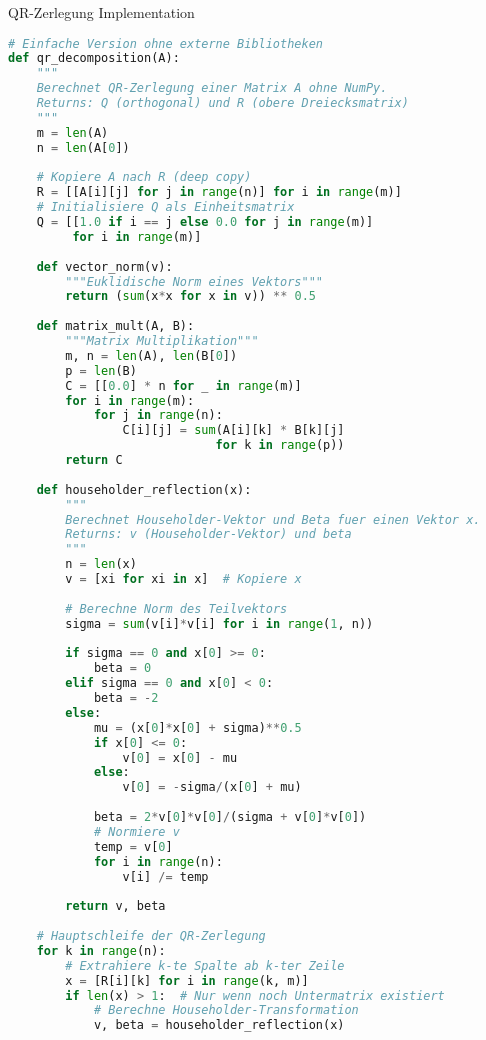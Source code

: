 \begin{examplecode}{QR-Zerlegung Implementation}
\begin{lstlisting}[language=Python, style=basesmol]
# Einfache Version ohne externe Bibliotheken
def qr_decomposition(A):
    """
    Berechnet QR-Zerlegung einer Matrix A ohne NumPy.
    Returns: Q (orthogonal) und R (obere Dreiecksmatrix)
    """
    m = len(A)
    n = len(A[0])
    
    # Kopiere A nach R (deep copy)
    R = [[A[i][j] for j in range(n)] for i in range(m)]
    # Initialisiere Q als Einheitsmatrix
    Q = [[1.0 if i == j else 0.0 for j in range(m)] 
         for i in range(m)]
    
    def vector_norm(v):
        """Euklidische Norm eines Vektors"""
        return (sum(x*x for x in v)) ** 0.5
    
    def matrix_mult(A, B):
        """Matrix Multiplikation"""
        m, n = len(A), len(B[0])
        p = len(B)
        C = [[0.0] * n for _ in range(m)]
        for i in range(m):
            for j in range(n):
                C[i][j] = sum(A[i][k] * B[k][j] 
                             for k in range(p))
        return C
    
    def householder_reflection(x):
        """
        Berechnet Householder-Vektor und Beta fuer einen Vektor x.
        Returns: v (Householder-Vektor) und beta
        """
        n = len(x)
        v = [xi for xi in x]  # Kopiere x
        
        # Berechne Norm des Teilvektors
        sigma = sum(v[i]*v[i] for i in range(1, n))
        
        if sigma == 0 and x[0] >= 0:
            beta = 0
        elif sigma == 0 and x[0] < 0:
            beta = -2
        else:
            mu = (x[0]*x[0] + sigma)**0.5
            if x[0] <= 0:
                v[0] = x[0] - mu
            else:
                v[0] = -sigma/(x[0] + mu)
                
            beta = 2*v[0]*v[0]/(sigma + v[0]*v[0])
            # Normiere v
            temp = v[0]
            for i in range(n):
                v[i] /= temp
                
        return v, beta
    
    # Hauptschleife der QR-Zerlegung
    for k in range(n):
        # Extrahiere k-te Spalte ab k-ter Zeile
        x = [R[i][k] for i in range(k, m)]
        if len(x) > 1:  # Nur wenn noch Untermatrix existiert
            # Berechne Householder-Transformation
            v, beta = householder_reflection(x)
            

\end{lstlisting}
\end{examplecode}

